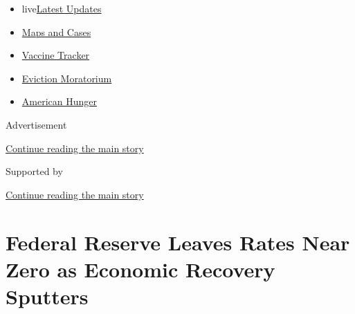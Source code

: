 \begin{itemize}
\tightlist
\item
  live\href{https://www.nytimes3xbfgragh.onion/2020/09/09/world/covid-19-coronavirus.html?name=styln-coronavirus-markets\&region=TOP_BANNER\&block=storyline_menu_recirc\&action=click\&pgtype=Article\&impression_id=44e9b200-f290-11ea-8ef7-cd06f6acdb7f\&variant=undefined}{Latest
  Updates}
\item
  \href{https://www.nytimes3xbfgragh.onion/interactive/2020/us/coronavirus-us-cases.html?name=styln-coronavirus-markets\&region=TOP_BANNER\&block=storyline_menu_recirc\&action=click\&pgtype=Article\&impression_id=44e9b201-f290-11ea-8ef7-cd06f6acdb7f\&variant=undefined}{Maps
  and Cases}
\item
  \href{https://www.nytimes3xbfgragh.onion/interactive/2020/science/coronavirus-vaccine-tracker.html?name=styln-coronavirus-markets\&region=TOP_BANNER\&block=storyline_menu_recirc\&action=click\&pgtype=Article\&impression_id=44e9b202-f290-11ea-8ef7-cd06f6acdb7f\&variant=undefined}{Vaccine
  Tracker}
\item
  \href{https://www.nytimes3xbfgragh.onion/2020/09/02/your-money/eviction-moratorium-covid.html?name=styln-coronavirus-markets\&region=TOP_BANNER\&block=storyline_menu_recirc\&action=click\&pgtype=Article\&impression_id=44e9b203-f290-11ea-8ef7-cd06f6acdb7f\&variant=undefined}{Eviction
  Moratorium}
\item
  \href{https://www.nytimes3xbfgragh.onion/interactive/2020/09/02/magazine/food-insecurity-hunger-us.html?name=styln-coronavirus-markets\&region=TOP_BANNER\&block=storyline_menu_recirc\&action=click\&pgtype=Article\&impression_id=44e9b204-f290-11ea-8ef7-cd06f6acdb7f\&variant=undefined}{American
  Hunger}
\end{itemize}

Advertisement

\protect\hyperlink{after-top}{Continue reading the main story}

Supported by

\protect\hyperlink{after-sponsor}{Continue reading the main story}

\hypertarget{federal-reserve-leaves-rates-near-zero-as-economic-recovery-sputters}{%
\section{Federal Reserve Leaves Rates Near Zero as Economic Recovery
Sputters}\label{federal-reserve-leaves-rates-near-zero-as-economic-recovery-sputters}}

